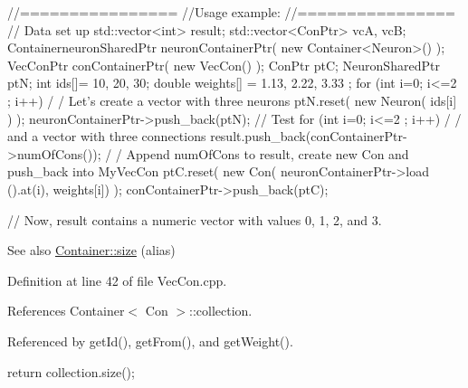 \begin{DoxyCode}
  //================
  //Usage example:
  //================
        // Data set up
                                std::vector<int> result;
                                std::vector<ConPtr> vcA, vcB;
                                ContainerneuronSharedPtr neuronContainerPtr( new 
      Container<Neuron>() );
                                VecConPtr conContainerPtr( new VecCon() );
                                ConPtr    ptC;
                                NeuronSharedPtr ptN;
                                int ids[]= {10, 20, 30};
                                double weights[] = {1.13, 2.22, 3.33 };
                                for (int i=0; i<=2 ; i++) {                             /
      / Let's create a vector with three neurons
                                        ptN.reset( new Neuron( ids[i] ) );
                                        neuronContainerPtr->push_back(ptN);
                                }
        // Test
                                for (int i=0; i<=2 ; i++) {                             /
      / and a vector with three connections
                                        result.push_back(conContainerPtr->numOfCons());                /
      / Append numOfCons to result, create new Con and push_back into MyVecCon
                                        ptC.reset( new Con( neuronContainerPtr->load
      ().at(i), weights[i]) );
                                        conContainerPtr->push_back(ptC);
                                }

        // Now, result contains a numeric vector with values 0, 1, 2, and 3.
\end{DoxyCode}


\begin{DoxySeeAlso}{See also}
\hyperlink{classvec_a_m_o_r_e_ae1289a7870dbdd19b6455a890e94ce48}{Container::size} (alias) 
\end{DoxySeeAlso}


Definition at line 42 of file VecCon.cpp.



References Container$<$ Con $>$::collection.



Referenced by getId(), getFrom(), and getWeight().


\begin{DoxyCode}
                       {
        return collection.size();
}
\end{DoxyCode}


